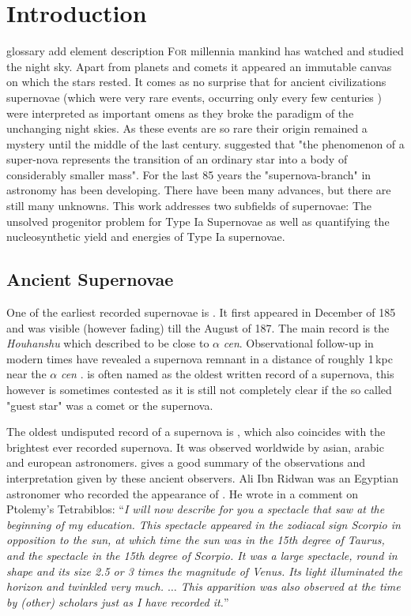 \chapter{Introduction}
\label{chap:intro}
glossary add element description
\lettrine[lines=4]{F}{or} millennia mankind has watched and studied the night sky. Apart from planets and comets it appeared an immutable canvas on which the stars rested. It comes as no surprise that for ancient civilizations supernovae (which were very rare events, occurring only every few centuries ) were interpreted as important omens as they broke the paradigm of the unchanging night skies. As these events are so rare their origin remained a mystery until the middle of the last century. \citet{1934PNAS...20..254B} suggested that "the phenomenon of a super-nova represents the transition of an ordinary star into a body of considerably smaller mass". For the last 85 years the "supernova-branch" in astronomy has been developing. There have been many advances, but there are still many unknowns. This work addresses two subfields of supernovae: The unsolved progenitor problem for Type Ia Supernovae as well as quantifying the nucleosynthetic yield and energies of Type Ia supernovae.


\section{Ancient Supernovae}
\label{sec:ancientsn}

One of the earliest recorded supernovae is . It first appeared in December of 185 and was visible (however fading) till the August of 187. The main record is the \textit{Houhanshu} \citep{2006ChJAA...6..635Z} which described  to be close to $\alpha$ \textit{cen}. Observational follow-up in modern times have revealed a supernova remnant in a distance of roughly 1\,kpc near the $\alpha$ \textit{cen} \citep{2006ChJAA...6..635Z}.  is often named as the oldest written record of a supernova, this however is sometimes contested as it is still not completely clear if the so called "guest star" was a comet or the supernova.

The oldest undisputed record of a supernova is , which also coincides with the brightest ever recorded supernova.  It was observed worldwide by asian, arabic and european astronomers. \citet{1965AJ.....70..105G} gives a good summary of the observations and interpretation given by these ancient observers. Ali Ibn Ridwan was an Egyptian astronomer who recorded the appearance of . He wrote in a comment on Ptolemy's Tetrabiblos: ``\textit{I will now describe for you a spectacle that saw at the beginning of my education. This spectacle appeared in the zodiacal sign Scorpio in opposition to the sun, at which time the sun was in the 15th degree of Taurus, and the spectacle in the 15th degree of Scorpio. It was a large spectacle, round in shape and its size 2.5 or 3 times the magnitude of Venus. Its light illuminated the horizon and twinkled very much. $\dots$ This apparition was also observed at the time by (other) scholars just as I have recorded it.}''

